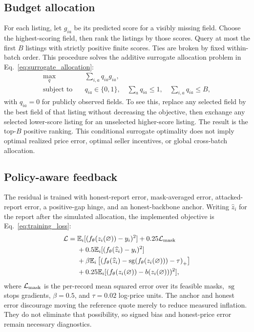 \subsection{Budget allocation}
For each listing, let $g_{ia}$ be its predicted score for a visibly missing
field. Choose the highest-scoring field, then rank the listings by those
scores. Query at most the first $B$ listings with strictly positive finite
scores. Ties are broken by fixed within-batch order. This procedure solves
the additive surrogate allocation problem in Eq.~\eqref{eq:surrogate_allocation}:
\begin{align}
\max_{q}\quad &\sum_{i,a}q_{ia}g_{ia},\nonumber\\
\text{subject to}\quad &q_{ia}\in\{0,1\},\quad
\sum_a q_{ia}\leq1,\quad\sum_{i,a}q_{ia}\leq B,
\label{eq:surrogate_allocation}
\end{align}
with $q_{ia}=0$ for publicly observed fields. To see this, replace any selected
field by the best field of that listing without decreasing the objective,
then exchange any selected lower-score listing for an unselected
higher-score listing. The result is the top-$B$ positive ranking.
This conditional surrogate optimality does not imply optimal realized price
error, optimal seller incentives, or global cross-batch allocation.

\subsection{Policy-aware feedback}
The residual is trained with honest-report error, mask-averaged error,
attacked-report error, a positive-gap hinge, and an honest-backbone anchor.
Writing $\widehat z_i$ for the report after the simulated allocation,
the implemented objective is Eq.~\eqref{eq:training_loss}:
\begin{align}
\mathcal L={}&\mathbb E_i[(f_\theta(z_i(\varnothing))-y_i)^2]
+0.25\mathcal L_{\rm mask}\nonumber\\
&+0.5\mathbb E_i[(f_\theta(\widehat z_i)-y_i)^2]\nonumber\\
&+\beta\mathbb E_i\left[\left(
f_\theta(\widehat z_i)-\operatorname{sg}(f_\theta(z_i(\varnothing)))
-\tau\right)_+\right]\nonumber\\
&+0.25\mathbb E_i[(f_\theta(z_i(\varnothing))-b(z_i(\varnothing)))^2],
\label{eq:training_loss}
\end{align}
where $\mathcal L_{\rm mask}$ is the per-record mean squared error over its
feasible masks, $\operatorname{sg}$ stops gradients, $\beta=0.5$, and
$\tau=0.02$ log-price units. The anchor and honest error discourage moving the
reference quote merely to reduce measured inflation. They do not eliminate
that possibility, so signed bias and honest-price error remain necessary
diagnostics.

